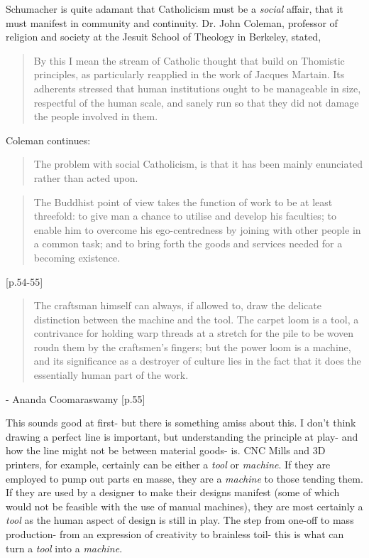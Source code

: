 \documentclass[10pt,letterpaper,openany]{book}
\begin{document}
Schumacher is quite adamant that Catholicism must be a \textit{social} affair, that it must manifest in community and continuity. Dr. John Coleman, professor of religion and society at the Jesuit School of Theology in Berkeley, stated,

\begin{quote}
By this I mean the stream of Catholic thought that build on Thomistic principles, as particularly reapplied in the work of Jacques Martain. Its adherents stressed that human institutions ought to be manageable in size, respectful of the human scale, and sanely run so that they did not damage the people involved in them.
\end{quote}


Coleman continues:

\begin{quote}
The problem with social Catholicism, is that it has been mainly enunciated rather than acted upon.
\end{quote}










\begin{quote}
The Buddhist point of view takes the function of work to be at least threefold: to give man a chance to utilise and develop his faculties; to enable him to overcome his ego-centredness by joining with other people in a common task; and to bring forth the goods and services needed for a becoming existence.
\end{quote} [p.54-55]

\begin{quote}
The craftsman himself can always, if allowed to, draw the delicate distinction between the machine and the tool. The carpet loom is a tool, a contrivance for holding warp threads at a stretch for the pile to be woven roudn them by the craftsmen's fingers; but the power loom is a machine, and its significance as a destroyer of culture lies in the fact that it does the essentially human part of the work.
\end{quote} - Ananda Coomaraswamy [p.55]

This sounds good at first- but there is something amiss about this. I don't think drawing a perfect line is important, but understanding the principle at play- and how the line might not be between material goods- is. CNC Mills and 3D printers, for example, certainly can be either a \textit{tool} or \textit{machine}. If they are employed to pump out parts en masse, they are a \textit{machine} to those tending them. If they are used by a designer to make their designs manifest (some of which would not be feasible with the use of manual machines), they are most certainly a \textit{tool} as the human aspect of design is still in play. The step from one-off to mass production- from an expression of creativity to brainless toil- this is what can turn a \textit{tool} into a \textit{machine}.
\end{document}
